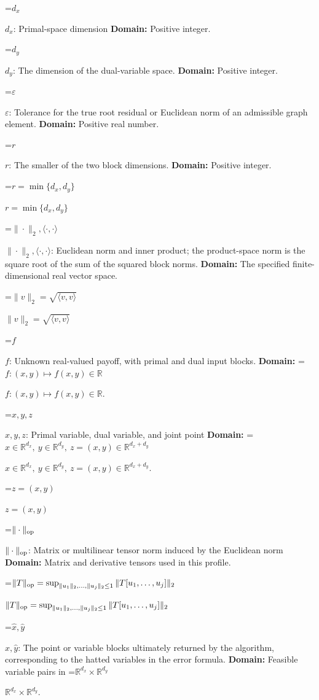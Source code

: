\documentclass[10pt,a4paper]{article}
\newcommand{\AtlasMath}[1]{\par\begingroup\centering\setbox0=\hbox{$\displaystyle #1$}\ifdim\wd0>1.4\linewidth\typeout{ATLAS WIDE FORMULA: \the\wd0}\fi\ifdim\wd0>\linewidth\resizebox{\linewidth}{!}{\box0}\else\box0\fi\par\endgroup}
\newcommand{\AtlasInlineMath}[1]{\begingroup\setbox0=\hbox{$#1$}\ifdim\wd0>.4\linewidth\endgroup\AtlasMath{#1}\else\endgroup$#1$\fi}
\begin{document}
\AtlasInlineMath{d_x}: Primal-space dimension \textbf{Domain:} Positive integer.



\AtlasInlineMath{d_y}: The dimension of the dual-variable space. \textbf{Domain:} Positive integer.



\AtlasInlineMath{\varepsilon}: Tolerance for the true root residual or Euclidean norm of an admissible graph element. \textbf{Domain:} Positive real number.



\AtlasInlineMath{r}: The smaller of the two block dimensions. \textbf{Domain:} Positive integer.



\AtlasInlineMath{r=\min\{d_x,d_y\}}



\AtlasInlineMath{\|\cdot\|_2,\langle\cdot,\cdot\rangle}: Euclidean norm and inner product; the product-space norm is the square root of the sum of the squared block norms. \textbf{Domain:} The specified finite-dimensional real vector space.



\AtlasInlineMath{\|v\|_2=\sqrt{\langle v,v\rangle}}



\AtlasInlineMath{f}: Unknown real-valued payoff, with primal and dual input blocks. \textbf{Domain:} \AtlasInlineMath{f:(x,y)\mapsto f(x,y)\in\mathbb R}.



\AtlasInlineMath{x,y,z}: Primal variable, dual variable, and joint point \textbf{Domain:} \AtlasInlineMath{x\in\mathbb R^{d_x},\ y\in\mathbb R^{d_y},\ z=(x,y)\in\mathbb R^{d_x+d_y}}.



\AtlasInlineMath{z=(x,y)}



\AtlasInlineMath{\|\cdot\|_{\rm op}}: Matrix or multilinear tensor norm induced by the Euclidean norm \textbf{Domain:} Matrix and derivative tensors used in this profile.



\AtlasInlineMath{\|T\|_{\rm op}=\sup_{\|u_1\|_2,\ldots,\|u_j\|_2\le1}\|T[u_1,\ldots,u_j]\|_2}



\AtlasInlineMath{\widehat x,\widehat y}: The point or variable blocks ultimately returned by the algorithm, corresponding to the hatted variables in the error formula. \textbf{Domain:} Feasible variable pairs in \AtlasInlineMath{\mathbb R^{d_x}\times\mathbb R^{d_y}}.
\end{document}
